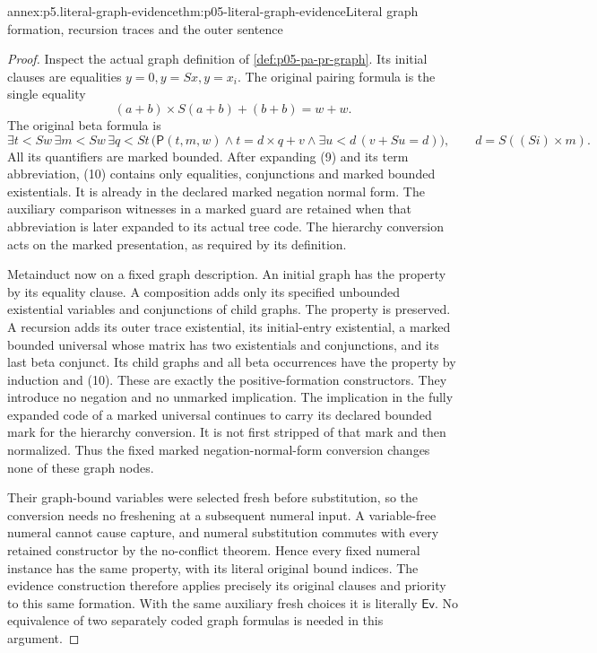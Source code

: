 \begin{annexitem}{annex:p5.literal-graph-evidence}{thm:p05-literal-graph-evidence}{Literal graph formation, recursion traces and the outer sentence}
\begin{proof}
Inspect the actual graph definition of
\cref{def:p05-pa-pr-graph}. Its initial clauses are equalities
\(y=0,y=Sx,y=x_i\). The original pairing formula is the single
equality
\[
              (a+b)\times S(a+b)+(b+b)=w+w.
\tag{9}
\]
The original beta formula is
\[
 \exists t<Sw\,\exists m<Sw\,\exists q<St\,
  \bigl(\mathsf P(t,m,w)\land t=d\times q+v
                   \land\exists u<d\,(v+Su=d)\bigr),
 \qquad d=S((Si)\times m).
\tag{10}
\]
All its quantifiers are marked bounded. After expanding (9) and its
term abbreviation, (10) contains only equalities, conjunctions and
marked bounded existentials. It is already in the declared marked
negation normal form. The auxiliary comparison witnesses in a marked
guard are retained when that abbreviation is later expanded to its
actual tree code. The hierarchy conversion acts on the marked
presentation, as required by its definition.

Metainduct now on a fixed graph description. An initial graph has the
property by its equality clause. A composition adds only its specified
unbounded existential variables and conjunctions of child graphs.
The property is preserved. A recursion adds its outer trace
existential, its initial-entry existential, a marked bounded universal
whose matrix has two existentials and conjunctions, and its last beta
conjunct. Its child graphs and all beta occurrences have the property
by induction and (10). These are exactly the positive-formation
constructors. They introduce no negation and no unmarked implication.
The implication in the fully expanded code of a marked universal
continues to carry its declared bounded mark for the hierarchy
conversion. It is not first stripped of that mark and then normalized.
Thus the fixed marked negation-normal-form conversion changes none of
these graph nodes.

Their graph-bound variables were selected fresh before substitution,
so the conversion needs no freshening at a subsequent numeral input.
A variable-free numeral cannot cause capture, and numeral substitution
commutes with every retained constructor by the no-conflict theorem.
Hence every fixed numeral instance has the same property, with its
literal original bound indices. The evidence construction therefore
applies precisely its original clauses and priority to this same
formation. With the same auxiliary fresh choices it is literally
\(\mathsf{Ev}\). No equivalence of two separately coded graph
formulas is needed in this argument.


\end{proof}
\end{annexitem}
